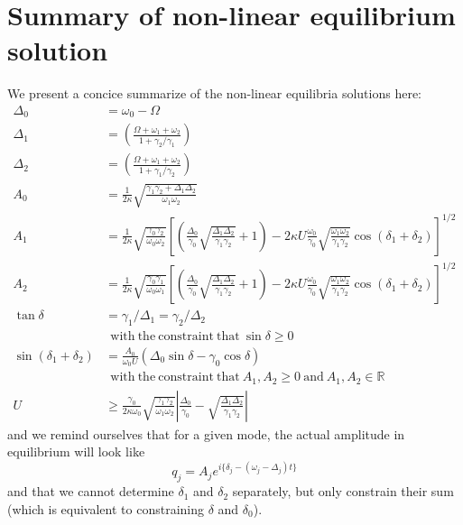 \section*{Summary of non-linear equilibrium solution}

We present a concice summarize of the non-linear equilibria solutions here:
\begin{subequations}
\begin{align}
\Delta_0 & = \omega_0 - \Omega \\
\Delta_1 & = \left(\frac{\Omega + \omega_1 + \omega_2}{1 + \gamma_2/\gamma_1}\right) \\
\Delta_2 & = \left(\frac{\Omega + \omega_1 + \omega_2}{1 + \gamma_1/\gamma_2}\right) \\
A_0 & = \frac{1}{2\kappa}\sqrt{\frac{\gamma_1\gamma_2 + \Delta_1\Delta_2}{\omega_1\omega_2}} \\
A_1 & = \frac{1}{2\kappa}\sqrt{\frac{\gamma_0\gamma_2}{\omega_0\omega_2}}\left[\left(\frac{\Delta_0}{\gamma_0}\sqrt{\frac{\Delta_1\Delta_2}{\gamma_1\gamma_2}} + 1 \right) - 2\kappa U \frac{\omega_0}{\gamma_0}\sqrt{\frac{\omega_1\omega_2}{\gamma_1\gamma_2}}\cos(\delta_1 + \delta_2)\right]^{1/2} \\
A_2 & = \frac{1}{2\kappa}\sqrt{\frac{\gamma_0\gamma_1}{\omega_0\omega_1}}\left[\left(\frac{\Delta_0}{\gamma_0}\sqrt{\frac{\Delta_1\Delta_2}{\gamma_1\gamma_2}} + 1 \right) - 2\kappa U \frac{\omega_0}{\gamma_0}\sqrt{\frac{\omega_1\omega_2}{\gamma_1\gamma_2}}\cos(\delta_1 + \delta_2)\right]^{1/2} \\
\tan\delta & = \gamma_1/\Delta_1 = \gamma_2/\Delta_2 \\
           & \mathrm{\ \ with\ the\ constraint\ that\ } \sin\delta \geq 0 \\
\sin(\delta_1 + \delta_2) & = \frac{A_0}{\omega_0 U}(\Delta_0\sin\delta - \gamma_0\cos\delta) \\
           & \mathrm{\ \ with\ the\ constraint\ that\ } A_1, A_2 \geq 0 \mathrm{\ and\ } A_1, A_2 \in \mathbb{R} \\
U & \geq \frac{\gamma_0}{2\kappa\omega_0}\sqrt{\frac{\gamma_1\gamma_2}{\omega_1\omega_2}}\left| \frac{\Delta_0}{\gamma_0} - \sqrt{\frac{\Delta_1\Delta_2}{\gamma_1\gamma_2}} \right|
\end{align}
\end{subequations}
and we remind ourselves that for a given mode, the actual amplitude in equilibrium will look like
\begin{equation}
q_j = A_j e^{i\{\delta_j - (\omega_j - \Delta_j)t \}}
\end{equation}
and that we cannot determine $\delta_1$ and $\delta_2$ separately, but only constrain their sum (which is equivalent to constraining $\delta$ and $\delta_0$).
